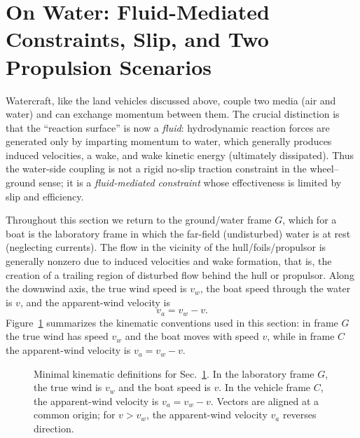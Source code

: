 \documentclass[reprint,aps,pra,longbibliography]{revtex4-2}
\begin{document}
\section{On Water: Fluid-Mediated Constraints, Slip, and Two Propulsion Scenarios}
\label{sec:water-sail-prop}

Watercraft, like the land vehicles discussed above, couple two media (air and
water) and can exchange momentum between them.  The crucial distinction is that
the ``reaction surface'' is now a \emph{fluid}: hydrodynamic reaction forces are
generated only by imparting momentum to water, which generally produces induced
velocities, a wake, and wake kinetic energy (ultimately dissipated).  Thus the
water-side coupling is not a rigid no-slip traction constraint in the
wheel--ground sense; it is a \emph{fluid-mediated constraint} whose effectiveness
is limited by slip and efficiency.

Throughout this section we return to the ground/water frame \(G\), which for a
boat is the laboratory frame in which the far-field
(undisturbed) water is at rest (neglecting currents). The flow in the vicinity
of the hull/foils/propulsor is generally nonzero due to induced velocities and
wake formation, that is, the
creation of a trailing region of disturbed flow behind the hull or propulsor.
Along the downwind axis, the true wind speed is \(v_w\), the boat speed
through the water is \(v\), and the apparent-wind velocity is
\[
v_a=v_w-v .
\]
Figure~\ref{fig:water-frame} summarizes the kinematic conventions used in this
section: in frame \(G\) the true wind has speed \(v_w\) and the boat moves with
speed \(v\), while in frame \(C\) the apparent-wind velocity is
\(v_a=v_w-v\).

\begin{figure}[tb]
\centering
{}
\caption{Minimal kinematic definitions for Sec.~\ref{sec:water-sail-prop}. In the laboratory frame \(G\), the true wind is \(v_w\) and the boat speed is \(v\). In the vehicle frame \(C\), the apparent-wind velocity is \(v_a = v_w - v\). Vectors are aligned at a common origin; for \(v > v_w\), the apparent-wind velocity \(v_a\) reverses direction.}
\label{fig:water-frame}
\end{figure}
\end{document}

